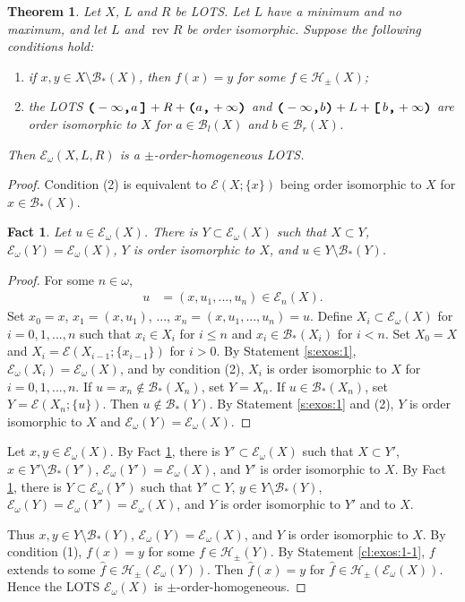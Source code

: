 \documentclass[preprint]{elsarticle}
\def\om{\omega}
\def\cB{\mathcal{B}}
\def\cE{\mathcal{E}}
\def\cH{\mathcal{H}}
\def\sset#1{\{#1\}}
\def\cB{{\mathcal B}}
\def\cB{{\mathcal B}}
\newtheorem{claim}{Fact}
\newtheorem{theorem}{Theorem}[section]
\theoremstyle{definition}
\theoremstyle{remark}
\def\rev{\operatorname{rev}}
\def\ilcomma/{\boldsymbol{,}}
\def\ilsymlp{\boldsymbol{(}}
\def\ilsymrp{\boldsymbol{)}}
\def\ilsymlc{\boldsymbol{[}}
\def\ilsymrc{\boldsymbol{]}}
\def\ilfont#1{\boldsymbol{#1}}
\def\ilfontX#1{\mathrm{\text{\texttt{\textbf{\large #1}}}}}
\def\ilfontX#1{{\text{\texttt{\textbf{\large \upshape #1}}}}}
\def\ilfont#1{\raisebox{-1.2pt}{\ilfontX{#1}}}
\def\ilfontC#1{\raisebox{-0.7pt}{\ilfontX{#1}}}
\def\ilcomma/{\ilfontC{,}}
\def\ilsymlp{\ilfont{(}}
\def\ilsymrp{\ilfont{)}}
\def\ilsymlc{\ilfont{[}\,}
\def\ilsymrc{\,\ilfont{]}}
\def\ilpp(#1,#2){\ilsymlp#1\ilcomma/ #2\ilsymrp}
\def\ilcp[#1,#2){\ilsymlc#1\ilcomma/ #2\ilsymrp}
\def\ilpc(#1,#2]{\ilsymlp#1\ilcomma/ #2\ilsymrc}
\def\oipm#1{\cH_{\pm}(#1)}
\def\er{\cB_r}
\def\el{\cB_l}
\def\ea{\cB_*}
\def\ex{\cE}
\begin{document}
\begin{theorem}\label{t:exos:1}
Let $X$, $L$ and $R$ be LOTS.
Let $L$ have a minimum and no maximum, and let $L$ and $\rev R$ be order isomorphic.
Suppose the following conditions hold:
\begin{enumerate}
\item
if $x,y\in X\setminus \ea(X)$, then $f(x)=y$ for some $f\in\oipm X$;
\item
the LOTS $\ilpc(-\infty,a] + R + \ilpp(a,+\infty)$ and $\ilpp(-\infty,b) + L + \ilcp[b,+\infty)$ are order isomorphic to $X$ for $a\in \el(X)$ and $b\in \er(X)$.
\end{enumerate}
Then $\ex_\om(X,L,R)$ is a $\pm$-order-homogeneous LOTS.
\end{theorem}
\begin{proof}
Condition (2) is equivalent to $\ex(X;\sset x)$ being order isomorphic to $X$ for $x\in\ea(X)$.
\begin{claim}\label{cl:exos:1}
Let $u\in \ex_\om(X)$. There is $Y\subset \ex_\om(X)$ such that $X\subset Y$, $\ex_\om(Y)=\ex_\om(X)$, $Y$ is order isomorphic to $X$, and $u\in Y\setminus \ea(Y)$.
\end{claim}
\begin{proof}
For some $n\in\om$,
\begin{align*}
u &= (x,u_1,...,u_n)\in \ex_n(X).
\end{align*}
Set $x_0=x$, $x_1=(x,u_1)$, ..., $x_n=(x,u_1,...,u_n)=u$. Define $X_i\subset \ex_\om(X)$ for $i=0,1,...,n$ such that $x_i\in X_i$ for $i\leq n$ and $x_i \in \ea(X_i)$ for $i<n$. Set $X_0=X$ and $X_i=\ex(X_{i-1};\sset{x_{i-1}})$ for $i>0$. By Statement \ref{s:exos:1}, $\ex_\om(X_i) = \ex_\om(X)$, and by condition (2), $X_i$ is order isomorphic to $X$ for $i=0,1,...,n$. If $u=x_n\notin \ea(X_n)$, set $Y=X_n$. If $u\in \ea(X_n)$, set $Y=\ex(X_{n};\sset{u})$. Then $u\notin \ea(Y)$. By Statement \ref{s:exos:1} and (2), $Y$ is order isomorphic to $X$ and $\ex_\om(Y)=\ex_\om(X)$.
\end{proof}
Let $x,y\in\ex_\om(X)$. By Fact \ref{cl:exos:1}, there is $Y'\subset \ex_\om(X)$ such that $X\subset Y'$, $x\in Y'\setminus \ea(Y')$, $\ex_\om(Y')=\ex_\om(X)$, and $Y'$ is order isomorphic to $X$. By Fact \ref{cl:exos:1}, there is $Y\subset \ex_\om(Y')$ such that $Y'\subset Y$, $y\in Y\setminus \ea(Y)$, $\ex_\om(Y)=\ex_\om(Y')=\ex_\om(X)$, and $Y$ is order isomorphic to $Y'$ and to $X$.

Thus $x,y\in Y\setminus \ea(Y)$, $\ex_\om(Y)=\ex_\om(X)$, and $Y$ is order isomorphic to $X$.
By condition (1), $f(x)=y$ for some $f\in\oipm Y$. By Statement \ref{cl:exos:1-1}, $f$ extends to some $\hat f\in \oipm{\ex_\om(Y)}$. Then $\hat f(x)=y$ for $\hat f\in \oipm{\ex_\om(X)}$. Hence the LOTS $\ex_\om(X)$ is $\pm$-order-homogeneous.
\end{proof}
\end{document}
